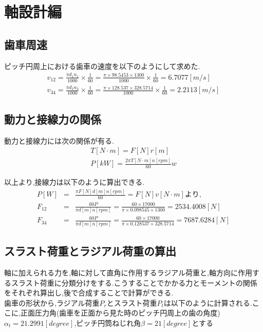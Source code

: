 \chapter{軸設計編}
\section{歯車周速}
ピッチ円周上における歯車の速度を以下のようにして求めた.
\begin{eqnarray}
v_{12}=\frac{\pi d_1 n_1}{1000} \times \frac{1}{60} = \frac{\pi \times 98.5453 \times 1300}{1000} \times \frac{1}{60} = 6.7077 [m/s]\\
v_{34}=\frac{\pi d_3 n_3}{1000} \times \frac{1}{60} = \frac{\pi \times 128.537 \times 328.5714}{1000} \times \frac{1}{60} = 2.2113 [m/s]
\end{eqnarray}

\section{動力と接線力の関係}
動力と接線力には次の関係が有る.
\begin{eqnarray}
T[N \cdot m]=F[N] r[m]\\
P[kW] = \frac{2\pi T[N \cdot m] n[rpm] }{60}w
\end{eqnarray}

以上より,接線力は以下のように算出できる.
\begin{eqnarray}
P[W] &=& \frac{\pi F[N] d[m] n[rpm] }{60}=F[N]v[N \cdot m]より,\nonumber\\
F_{12}&=& \frac{60P}{\pi d[m] n[rpm] } = \frac{60 \times 17000}{\pi \times 0.098545 \times  1300 } = 2534.4008[N]\\
F_{34}&=& \frac{60P}{\pi d[m] n[rpm] } = \frac{60 \times 17000}{\pi \times 0.128537 \times 328.5714} = 7687.6284[N]
\end{eqnarray}

\section{スラスト荷重とラジアル荷重の算出}
軸に加えられる力を,軸に対して直角に作用するラジアル荷重と,軸方向に作用するスラスト荷重に分類分けをする.こうすることでかかる力とモーメントの関係をそれぞれ算出し,後で合成することで計算ができる.\\
歯車の形状から,ラジアル荷重$P_r$とスラスト荷重$P_t$は以下のように計算される.ここに,正面圧力角(歯車を正面から見た時のピッチ円周上の歯の角度)$\alpha_t=21.2991[degree]$,ピッチ円筒ねじれ角$\beta =21[degree]$とする\\

